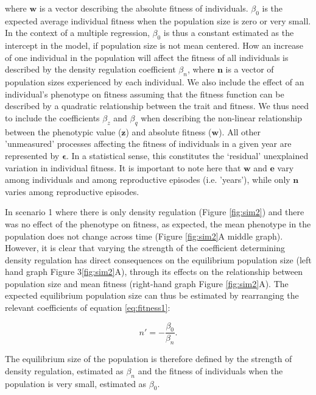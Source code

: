 \documentclass{article}
\begin{document}
\noindent where $\mathbf{w}$ is a vector describing the absolute fitness of individuals. $\beta_{0}$ is the expected average individual fitness when the population size is zero or very small. In the context of a multiple regression, $\beta_{0}$ is thus a constant estimated as the intercept in the model, if population size is not mean centered. How an increase of one individual in the population will affect the fitness of all individuals is described by the density regulation coefficient $\beta_{n}$, where $\mathbf{n}$ is a vector of population sizes experienced by each individual. We also include the effect of an individual's phenotype on fitness assuming that the fitness function can be described by a quadratic relationship between the trait and fitness. We thus need to include the coefficients $\beta_{z}$ and $\beta_{q}$ when describing the non-linear relationship between the phenotypic value ($\mathbf{z}$) and absolute fitness ($\mathbf{w}$). All other 'unmeasured' processes affecting the fitness of individuals in a given year are represented by $ \mathbf{\epsilon}$. In a statistical sense, this constitutes the `residual' unexplained variation in individual fitness. It is important to note here that $\mathbf{w}$ and $\mathbf{e}$ vary among individuals and among reproductive episodes (i.e. 'years'), while only $\mathbf{n}$ varies among reproductive episodes.

In scenario 1 where there is only density regulation (Figure \ref{fig:sim2}) and there was no effect of the phenotype on fitness, as expected, the mean phenotype in the population does not change across time (Figure \ref{fig:sim2}A middle graph). However, it is clear that varying the strength of the coefficient determining density regulation has direct consequences on the equilibrium population size (left hand graph Figure 3\ref{fig:sim2}A), through its effects on the relationship between population size and mean fitness (right-hand graph Figure \ref{fig:sim2}A). The expected equilibrium population size can thus be estimated by rearranging the relevant coefficients of equation \ref{eq:fitness1}:

\begin{equation}\label{eq:equilibrium}
n'=-\frac{\beta_{0}}{\beta_n}. 
\end{equation} 

\noindent The equilibrium size of the population is therefore defined by the strength of density regulation, estimated as $\beta_n$ and the fitness of individuals when the population is very small, estimated as $\beta_0$. 
\end{document}
